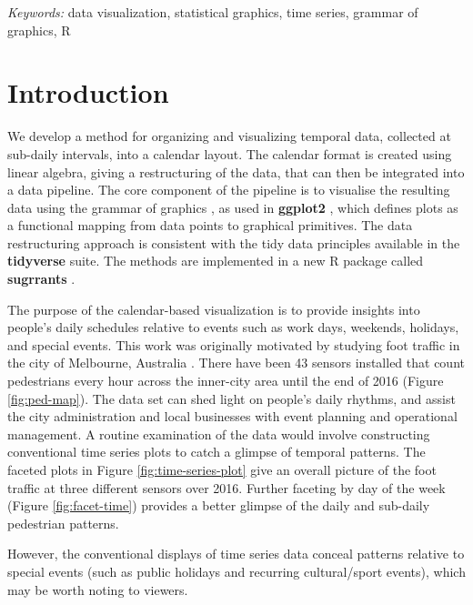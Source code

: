 \documentclass[12pt]{article}
\begin{document}
\noindent%
{\it Keywords:} data visualization, statistical graphics, time series, grammar of graphics, R
\vfill

\newpage
{} %

\hypertarget{introduction}{%
\section{Introduction}\label{introduction}}

We develop a method for organizing and visualizing temporal data, collected at sub-daily intervals, into a calendar layout. The calendar format is created using linear algebra, giving a restructuring of the data, that can then be integrated into a data pipeline. The core component of the pipeline is to visualise the resulting data using the grammar of graphics \citep{wilkinson2006grammar, wickham2009ggplot2}, as used in \textbf{ggplot2} \citep{R-ggplot2}, which defines plots as a functional mapping from data points to graphical primitives. The data restructuring approach is consistent with the tidy data principles available in the \textbf{tidyverse} \citep{R-tidyverse} suite. The methods are implemented in a new R package called \textbf{sugrrants} \citep{R-sugrrants}.

The purpose of the calendar-based visualization is to provide insights into people's daily schedules relative to events such as work days, weekends, holidays, and special events. This work was originally motivated by studying foot traffic in the city of Melbourne, Australia \citep{ped}. There have been 43 sensors installed that count pedestrians every hour across the inner-city area until the end of 2016 (Figure \ref{fig:ped-map}). The data set can shed light on people's daily rhythms, and assist the city administration and local businesses with event planning and operational management. A routine examination of the data would involve constructing conventional time series plots to catch a glimpse of temporal patterns. The faceted plots in Figure \ref{fig:time-series-plot} give an overall picture of the foot traffic at three different sensors over 2016. Further faceting by day of the week (Figure \ref{fig:facet-time}) provides a better glimpse of the daily and sub-daily pedestrian patterns.

However, the conventional displays of time series data conceal patterns relative to special events (such as public holidays and recurring cultural/sport events), which may be worth noting to viewers.
\end{document}
